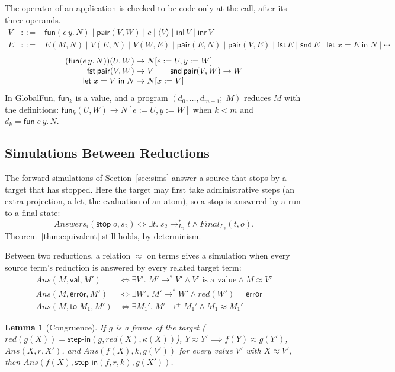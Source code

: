 \documentclass[10pt]{article}
\theoremstyle{acmplain}
\newtheorem{lemma}[theorem]{Lemma}
\newcommand{\key}[1]{\mathsf{#1}}
\newcommand{\Let}{\key{let}\;}
\newcommand{\In}{\;\key{in}\;}
\newcommand{\inl}{\key{inl}\,}
\newcommand{\inr}{\key{inr}\,}
\newcommand{\tuple}[1]{\langle #1 \rangle}
\newcommand{\fun}[1]{\key{fun}(#1)}
\newcommand{\funref}[1]{\key{fun}_{#1}}
\newcommand{\pair}[2]{\key{pair}(#1, #2)}
\newcommand{\FST}{\key{fst}\,}
\newcommand{\SND}{\key{snd}\,}
\newcommand{\stp}{\key{stop}\;}
\newcommand{\error}{\key{error}}
\newcommand{\Final}{\mathit{Final}}
\newcommand{\lto}{\longrightarrow}
\begin{document}
The operator of an application is checked to be code only at the call,
after its three operands.
\[
\begin{array}{rcl}
  V &::=& \fun{e\,y.\,N} \mid \pair{V}{W} \mid c \mid \tuple{\bar{V}} \mid \inl V \mid \inr V \\
  E &::=& E(M, N) \mid V(E, N) \mid V(W, E) \mid \pair{E}{N} \mid \pair{V}{E} \mid \FST E \mid \SND E
    \mid \Let x = E \In N \mid \cdots
\end{array}
\]
\[
\begin{array}{@{}r@{\;\to\;}l@{}}
  (\fun{e\,y.\,N})(U, W) & N[e := U, y := W] \\
  \FST \pair{V}{W} & V \qquad \SND \pair{V}{W} \to W \\
  \Let x = V \In N & N[x := V]
\end{array}
\]
In GlobalFun, $\funref{k}$ is a value, and a program $(d_0, \ldots, d_{m-1};\; M)$
reduces $M$ with the definitions:
$\funref{k}(U, W) \to N[e := U, y := W]$ when $k < m$ and $d_k = \key{fun}\; e\,y.\,N$.

\subsection{Simulations Between Reductions}\label{sec:red-sims}

The forward simulations of Section~\ref{sec:sims} answer a source that stops
by a target that has stopped. Here the target may first take administrative
steps (an extra projection, a let, the evaluation of an atom), so a stop
is answered by a run to a final state:
\[
  \mathit{Answers}_i(\stp o, s_2) \iff \exists t.\; s_2 \lto_{L_2}^* t \land \Final_{L_2}(t, o) .
\]
Theorem~\ref{thm:equivalent} still holds, by determinism.

Between two reductions, a relation $\approx$ on terms gives a simulation when
every source term's reduction is answered by every related target term:
\begin{align*}
  \mathit{Ans}(M, \key{val}, M') &\iff \exists V'.\; M' \lto^* V' \land V' \text{ is a value} \land M \approx V' \\
  \mathit{Ans}(M, \error, M') &\iff \exists W'.\; M' \lto^* W' \land \mathit{red}(W') = \error \\
  \mathit{Ans}(M, \key{to}\; M_1, M') &\iff \exists M_1'.\; M' \lto^+ M_1' \land M_1 \approx M_1'
\end{align*}

\begin{lemma}[Congruence]\label{lem:ans-in}
If $g$ is a frame of the target ($\mathit{red}(g(X)) = \key{step\text{-}in}(g, \mathit{red}(X), \kappa(X))$),
$Y \approx Y' \implies f(Y) \approx g(Y')$, $\mathit{Ans}(X, r, X')$, and
$\mathit{Ans}(f(X), k, g(V'))$ for every value $V'$ with $X \approx V'$, then
$\mathit{Ans}(f(X), \key{step\text{-}in}(f, r, k), g(X'))$.
\end{lemma}
\end{document}
